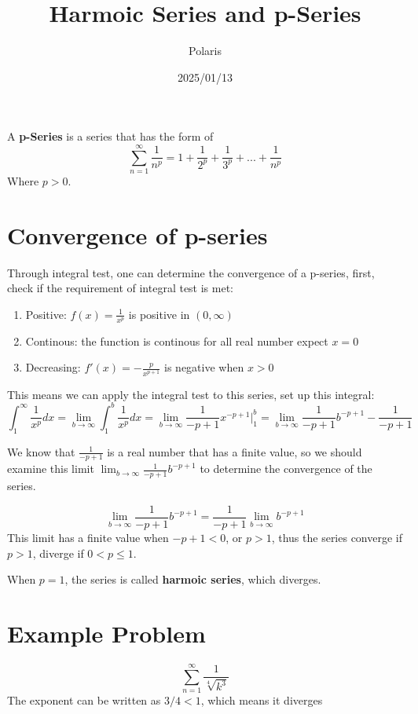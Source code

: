 \documentclass{article}
\title{Harmoic Series and p-Series}
\author{Polaris}
\date{2025/01/13}
\numberwithin{equation}{section}
\begin{document}
\maketitle

A \textbf{p-Series} is a series that has the form of
\[
    \sum_{n = 1}^{\infty} \frac{1}{n^p} = 1 + \frac{1}{2^p} + \frac{1}{3^p} + ... + \frac{1}{n^p}
\]
Where $p > 0$.

\section{Convergence of p-series}
Through integral test, one can determine the convergence of a p-series, first, check if the requirement of integral test is met:
    \begin{enumerate}
        \item Positive: $\displaystyle f(x) = \frac{1}{x^p}$ is positive in $(0 , \infty)$
        \item Continous: the function is continous for all real number expect $x=0$
        \item Decreasing: $\displaystyle f'(x) = -\frac{p}{x^{p+1}}$ is negative when $x > 0$
    \end{enumerate}

This means we can apply the integral test to this series, set up this integral:
\[
\int_{1}^{\infty} \frac{1}{x^p}dx = \lim_{b\to \infty} \int_{1}^{b} \frac{1}{x^p} dx = \lim_{b\to \infty}\frac{1}{-p+1}x^{-p+1}\Big|_1^b = \lim_{b\to \infty} \frac{1}{-p+1} b^{-p+1} - \frac{1}{-p+1}
\]

We know that $\displaystyle \frac{1}{-p+1}$ is a real number that has a finite value, so we should examine this limit $\displaystyle  \lim_{b\to \infty} \frac{1}{-p+1} b^{-p+1}$ to determine the convergence of the series.

\[
 \lim_{b\to \infty} \frac{1}{-p+1} b^{-p+1} = \frac{1}{-p+1} \lim_{b\to \infty}b^{-p+1} 
\]
This limit has a finite value when $-p+1 < 0$, or $p>1$, thus the series converge if $p > 1$, diverge if $0 < p \leq 1$.

When $p = 1$, the series is called \textbf{harmoic series}, which diverges.

\section{Example Problem}
    \[
    \sum_{n = 1}^{\infty} \frac{1}{\sqrt[4]{k^3}}
    \]
    The exponent can be written as $3/4 < 1$, which means it diverges
\end{document}
